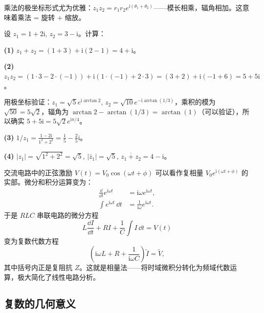 乘法的极坐标形式尤为优雅：$z_1 z_2 = r_1 r_2 e^{\mathrm{i}(\theta_1 + \theta_2)}$——模长相乘，辐角相加。这意味着乘法 = 旋转 + 缩放。

\begin{example}[复数的基本运算]
设 $z_1 = 1 + 2\mathrm{i}$, $z_2 = 3 - \mathrm{i}$。计算：

\textbf{(1)} $z_1 + z_2 = (1+3) + \mathrm{i}(2-1) = 4 + \mathrm{i}$。

\textbf{(2)} $z_1 z_2 = (1\cdot3 - 2\cdot(-1)) + \mathrm{i}(1\cdot(-1) + 2\cdot3) = (3+2) + \mathrm{i}(-1+6) = 5 + 5\mathrm{i}$。

用极坐标验证：$z_1 = \sqrt{5}e^{\mathrm{i}\arctan 2}$, $z_2 = \sqrt{10}e^{-\mathrm{i}\arctan(1/3)}$，乘积的模为 $\sqrt{50}=5\sqrt{2}$，辐角为 $\arctan 2 - \arctan(1/3) = \arctan(1)$（可以验证），所以确实 $5 + 5\mathrm{i}=5\sqrt{2}e^{\mathrm{i}\pi/4}$。

\textbf{(3)} $1/z_1 = \frac{1-2\mathrm{i}}{1^2+2^2} = \frac{1}{5} - \frac{2}{5}\mathrm{i}$。

\textbf{(4)} $|z_1| = \sqrt{1^2+2^2} = \sqrt{5}$, $|\bar{z}_1| = \sqrt{5}$, $\overline{z_1+z_2} = 4 - \mathrm{i}$。
\end{example}

\begin{insight}[相量法的物理核心]
交流电路中的正弦激励 $V(t) = V_0\cos(\omega t + \phi)$ 可以看作复相量 $V_0 e^{\mathrm{i}(\omega t+\phi)}$ 的实部。微分和积分运算变为：
\begin{align}
\frac{\dd}{\dd t} e^{\mathrm{i}\omega t} &= \mathrm{i}\omega e^{\mathrm{i}\omega t},\\
\int e^{\mathrm{i}\omega t}\,\dd t &= \frac{1}{\mathrm{i}\omega} e^{\mathrm{i}\omega t}.
\end{align}
于是 $RLC$ 串联电路的微分方程
\begin{equation}
L\frac{\dd I}{\dd t} + RI + \frac{1}{C}\int I\,\dd t = V(t)
\end{equation}
变为复数代数方程
\begin{equation}
\left(\mathrm{i}\omega L + R + \frac{1}{\mathrm{i}\omega C}\right)\tilde{I} = \tilde{V},
\end{equation}
其中括号内正是复阻抗 $Z$。这就是相量法——将时域微积分转化为频域代数运算，极大简化了线性电路分析。
\end{insight}

\subsection{复数的几何意义}

